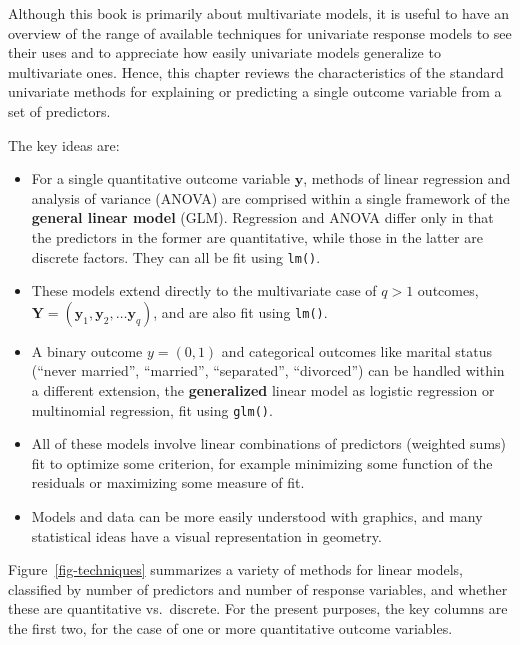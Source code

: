 \documentclass[
  letterpaper,
  10pt,
  krantz2]{krantz}
\begin{document}
Although this book is primarily about multivariate models, it is useful
to have an overview of the range of available techniques for univariate
response models to see their uses and to appreciate how easily
univariate models generalize to multivariate ones. Hence, this chapter
reviews the characteristics of the standard univariate methods for
explaining or predicting a single outcome variable from a set of
predictors.

The key ideas are:

\begin{itemize}
\item
  For a single quantitative outcome variable \(\mathbf{y}\), methods of
  linear regression and analysis of variance (ANOVA) are comprised
  within a single framework of the \textbf{general linear model} (GLM).
  Regression and ANOVA differ only in that the predictors in the former
  are quantitative, while those in the latter are discrete factors. They
  can all be fit using \texttt{lm()}.
\item
  These models extend directly to the multivariate case of \(q > 1\)
  outcomes,
  \(\mathbf{Y} = (\mathbf{y}_1, \mathbf{y}_2, \dots \mathbf{y}_q)\), and
  are also fit using \texttt{lm()}.
\item
  A binary outcome \(y = (0, 1)\) and categorical outcomes like marital
  status (``never married'', ``married'', ``separated'', ``divorced'')
  can be handled within a different extension, the \textbf{generalized}
  linear model as logistic regression or multinomial regression, fit
  using \texttt{glm()}.
\item
  All of these models involve linear combinations of predictors
  (weighted sums) fit to optimize some criterion, for example minimizing
  some function of the residuals or maximizing some measure of fit.
\item
  Models and data can be more easily understood with graphics, and many
  statistical ideas have a visual representation in geometry.
\end{itemize}

Figure~\ref{fig-techniques} summarizes a variety of methods for linear
models, classified by number of predictors and number of response
variables, and whether these are quantitative vs.~discrete. For the
present purposes, the key columns are the first two, for the case of one
or more quantitative outcome variables.
\end{document}
